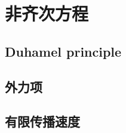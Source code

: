 \section{非齐次方程}
\label{b2:sec:0902}


\subsection{Duhamel principle}
\label{b2:subsec:090201}

\subsection{外力项}
\label{b2:subsec:090202}

\subsection{有限传播速度}
\label{b2:subsec:090203}


